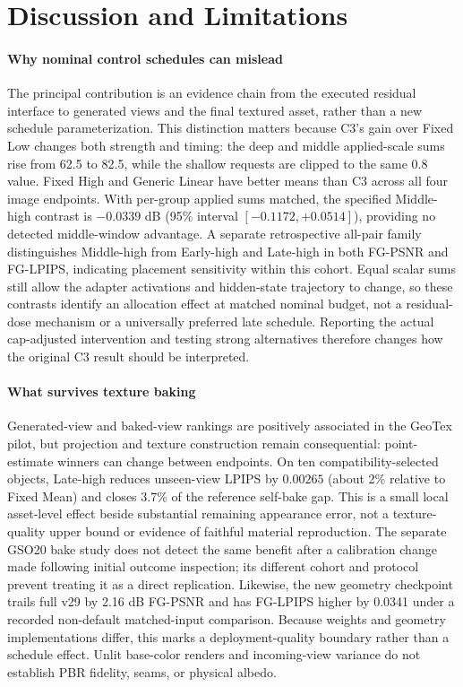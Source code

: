 \documentclass[times,twocolumn,final]{elsarticle}
\begin{document}
\FloatBarrier
\section{Discussion and Limitations}
\label{sec:limitations}

\paragraph{Why nominal control schedules can mislead}
The principal contribution is an evidence chain from the executed residual interface to generated views and the final textured asset, rather than a new schedule parameterization. This distinction matters because C3's gain over Fixed Low changes both strength and timing: the deep and middle applied-scale sums rise from 62.5 to 82.5, while the shallow requests are clipped to the same 0.8 value. Fixed High and Generic Linear have better means than C3 across all four image endpoints. With per-group applied sums matched, the specified Middle-high contrast is $-0.0339$ dB (95\% interval $[-0.1172,+0.0514]$), providing no detected middle-window advantage. A separate retrospective all-pair family distinguishes Middle-high from Early-high and Late-high in both FG-PSNR and FG-LPIPS, indicating placement sensitivity within this cohort. Equal scalar sums still allow the adapter activations and hidden-state trajectory to change, so these contrasts identify an allocation effect at matched nominal budget, not a residual-dose mechanism or a universally preferred late schedule. Reporting the actual cap-adjusted intervention and testing strong alternatives therefore changes how the original C3 result should be interpreted.

\paragraph{What survives texture baking}
Generated-view and baked-view rankings are positively associated in the GeoTex pilot, but projection and texture construction remain consequential: point-estimate winners can change between endpoints. On ten compatibility-selected objects, Late-high reduces unseen-view LPIPS by $0.00265$ (about 2\% relative to Fixed Mean) and closes 3.7\% of the reference self-bake gap. This is a small local asset-level effect beside substantial remaining appearance error, not a texture-quality upper bound or evidence of faithful material reproduction. The separate GSO20 bake study does not detect the same benefit after a calibration change made following initial outcome inspection; its different cohort and protocol prevent treating it as a direct replication. Likewise, the new geometry checkpoint trails full v29 by 2.16 dB FG-PSNR and has FG-LPIPS higher by 0.0341 under a recorded non-default matched-input comparison. Because weights and geometry implementations differ, this marks a deployment-quality boundary rather than a schedule effect. Unlit base-color renders and incoming-view variance do not establish PBR fidelity, seams, or physical albedo.
\end{document}
